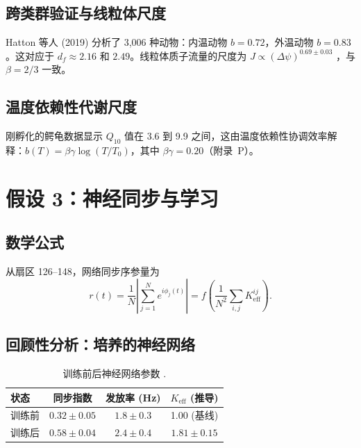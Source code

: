 \documentclass[11pt,a4paper]{article}
\begin{document}
	\subsection{跨类群验证与线粒体尺度}
	
	Hatton 等人 (2019) 分析了 3,006 种动物：内温动物 \(b=0.72\)，外温动物 \(b=0.83\)。这对应于 \(d_f \approx 2.16\) 和 \(2.49\)。线粒体质子流量的尺度为 \(J \propto (\Delta \psi)^{0.69 \pm 0.03}\) \cite{West2023}，与 \(\beta=2/3\) 一致。
	
	\subsection{温度依赖性代谢尺度}
	
	刚孵化的鳄龟数据显示 \(Q_{10}\) 值在 3.6 到 9.9 之间，这由温度依赖性协调效率解释：\(b(T) = \beta\gamma \log(T/T_0)\)，其中 \(\beta\gamma = 0.20\)（附录~P）。
	
	\section{假设 3：神经同步与学习}
	
	\subsection{数学公式}
	
	从扇区 126--148，网络同步序参量为
	\begin{equation}
		r(t) = \frac{1}{N}\left|\sum_{j=1}^N e^{i\phi_j(t)}\right| = f\left(\frac{1}{N^2}\sum_{i,j} K_{\text{eff}}^{ij}\right).
		\label{eq:sync_order}
	\end{equation}
	
	\subsection{回顾性分析：培养的神经网络}
	
	\begin{table}[H]
		\centering
		\caption{训练前后神经网络参数 \cite{PLOS2025b}.}
		\label{tab:neural-training}
		\begin{tabular}{lccc}
			\toprule
			\textbf{状态} & \textbf{同步指数} & \textbf{发放率 (Hz)} & \(K_{\text{eff}}\) (推导) \\
			\midrule
			训练前 & \(0.32 \pm 0.05\) & \(1.8 \pm 0.3\) & 1.00 (基线) \\
			训练后 & \(0.58 \pm 0.04\) & \(2.4 \pm 0.4\) & \(1.81 \pm 0.15\) \\
			\bottomrule
		\end{tabular}
	\end{table}
	
\end{document}
